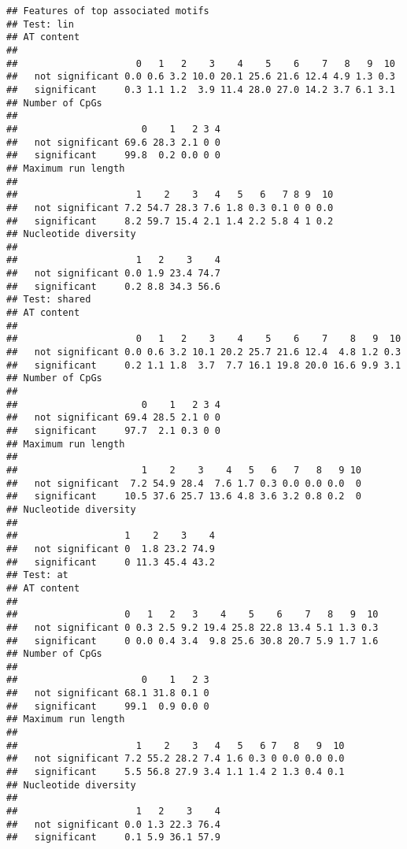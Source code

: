 \documentclass{article}\usepackage[]{graphicx}\usepackage[]{color}
\makeatletter
\newenvironment{kframe}{%
 \def\at@end@of@kframe{}%
 \ifinner\ifhmode%
  \def\at@end@of@kframe{\end{minipage}}%
  \begin{minipage}{\columnwidth}%
 \fi\fi%
 \def\FrameCommand##1{\hskip\@totalleftmargin \hskip-\fboxsep
 \colorbox{shadecolor}{##1}\hskip-\fboxsep
     \hskip-\linewidth \hskip-\@totalleftmargin \hskip\columnwidth}%
 \MakeFramed {\advance\hsize-\width
   \@totalleftmargin\z@ \linewidth\hsize
   \@setminipage}}%
 {\par\unskip\endMakeFramed%
 \at@end@of@kframe}
\newenvironment{knitrout}{}{} %
\makeatother
\begin{document}
\begin{knitrout}
\color{fgcolor}\begin{kframe}
\begin{verbatim}
## Features of top associated motifs
## Test: lin 
## AT content 
##                  
##                     0   1   2    3    4    5    6    7   8   9  10
##   not significant 0.0 0.6 3.2 10.0 20.1 25.6 21.6 12.4 4.9 1.3 0.3
##   significant     0.3 1.1 1.2  3.9 11.4 28.0 27.0 14.2 3.7 6.1 3.1
## Number of CpGs 
##                  
##                      0    1   2 3 4
##   not significant 69.6 28.3 2.1 0 0
##   significant     99.8  0.2 0.0 0 0
## Maximum run length 
##                  
##                     1    2    3   4   5   6   7 8 9  10
##   not significant 7.2 54.7 28.3 7.6 1.8 0.3 0.1 0 0 0.0
##   significant     8.2 59.7 15.4 2.1 1.4 2.2 5.8 4 1 0.2
## Nucleotide diversity 
##                  
##                     1   2    3    4
##   not significant 0.0 1.9 23.4 74.7
##   significant     0.2 8.8 34.3 56.6
## Test: shared 
## AT content 
##                  
##                     0   1   2    3    4    5    6    7    8   9  10
##   not significant 0.0 0.6 3.2 10.1 20.2 25.7 21.6 12.4  4.8 1.2 0.3
##   significant     0.2 1.1 1.8  3.7  7.7 16.1 19.8 20.0 16.6 9.9 3.1
## Number of CpGs 
##                  
##                      0    1   2 3 4
##   not significant 69.4 28.5 2.1 0 0
##   significant     97.7  2.1 0.3 0 0
## Maximum run length 
##                  
##                      1    2    3    4   5   6   7   8   9 10
##   not significant  7.2 54.9 28.4  7.6 1.7 0.3 0.0 0.0 0.0  0
##   significant     10.5 37.6 25.7 13.6 4.8 3.6 3.2 0.8 0.2  0
## Nucleotide diversity 
##                  
##                   1    2    3    4
##   not significant 0  1.8 23.2 74.9
##   significant     0 11.3 45.4 43.2
## Test: at 
## AT content 
##                  
##                   0   1   2   3    4    5    6    7   8   9  10
##   not significant 0 0.3 2.5 9.2 19.4 25.8 22.8 13.4 5.1 1.3 0.3
##   significant     0 0.0 0.4 3.4  9.8 25.6 30.8 20.7 5.9 1.7 1.6
## Number of CpGs 
##                  
##                      0    1   2 3
##   not significant 68.1 31.8 0.1 0
##   significant     99.1  0.9 0.0 0
## Maximum run length 
##                  
##                     1    2    3   4   5   6 7   8   9  10
##   not significant 7.2 55.2 28.2 7.4 1.6 0.3 0 0.0 0.0 0.0
##   significant     5.5 56.8 27.9 3.4 1.1 1.4 2 1.3 0.4 0.1
## Nucleotide diversity 
##                  
##                     1   2    3    4
##   not significant 0.0 1.3 22.3 76.4
##   significant     0.1 5.9 36.1 57.9
\end{verbatim}
\end{kframe}
\end{knitrout}
\end{document}
